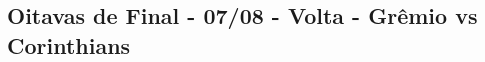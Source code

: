 \subsection{Oitavas de Final - 07/08 - Volta - Grêmio vs Corinthians}

\begin{figure}[H]
    \centering
    
\end{figure}